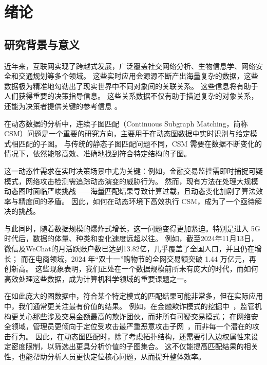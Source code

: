 \chapter{绪论}
\section{研究背景与意义}
近年来，互联网实现了跨越式发展，广泛覆盖社交网络分析、生物信息学、网络安全和交通规划等多个领域。
这些实时应用会源源不断产出海量复杂的数据，这些数据极为精准地勾勒出了现实世界中不同对象间的关联关系。
这些信息将有助于人们获得重要的决策指导信息。
这些关系数据不仅有助于描述复杂的对象关系，还能为决策者提供关键的参考信息 。


在动态数据的分析中，连续子图匹配（Continuous Subgraph Matching，简称CSM）问题是一个重要的研究方向，主要用于在动态图数据中实时识别与给定模式相匹配的子图。
与传统的静态子图匹配问题不同，CSM 需要在数据不断变化的情况下，依然能够高效、准确地找到符合特定结构的子图。

这一动态性需求在​​实时决策场景​​中尤为关键：例如，金融交易监控需即时捕捉可疑模式，网络攻击检测需追踪动态演变的威胁行为。
然而，现有方法在处理大规模动态图时面临严峻挑战——​​海量匹配结果导致计算过载​​，且动态变化加剧了算法效率与精度间的矛盾。
因此，如何在动态环境下高效执行 CSM，成为了一个亟待解决的挑战。

与此同时，随着数据规模的爆炸式增长，这一问题变得更加紧迫。特别是进入 5G 时代后，数据的体量、种类和变化速度远超以往。
例如，截至2024年11月13日，微信及WeChat的月活跃账户数已达到13.82亿，几乎覆盖了全国人口，并且仍在增长；
而在电商领域，2024 年“双十一”购物节的全网交易额突破 1.44 万亿元，再创新高。
这些现象表明，我们正处在一个数据规模前所未有庞大的时代，而如何高效处理这些数据，成为计算机科学领域的重要课题之一。

在如此庞大的图数据中，符合某个特定模式的匹配结果可能非常多，但在实际应用中，我们通常更关注最有价值的结果。
例如，在金融欺诈模式的挖掘中~\cite{csm-cycle-DBLP:journals/pvldb/QiuCQPZLZ18}，监管机构更关心那些涉及交易金额最高的欺诈团伙，而非所有可疑交易模式；
在网络安全领域，管理员更倾向于定位受攻击最严重恶意攻击子网~\cite{traffic-graph-matching-DBLP:journals/pvldb/SongGCW14}，而非每一个潜在的攻击行为。
因此，在动态图匹配时，除了考虑拓扑结构，还需要引入边权属性来设定密度限制，以筛选出更具分析价值的子图集合。
这不仅能提高匹配结果的相关性，也能帮助分析人员更快定位核心问题，从而提升整体效率。

